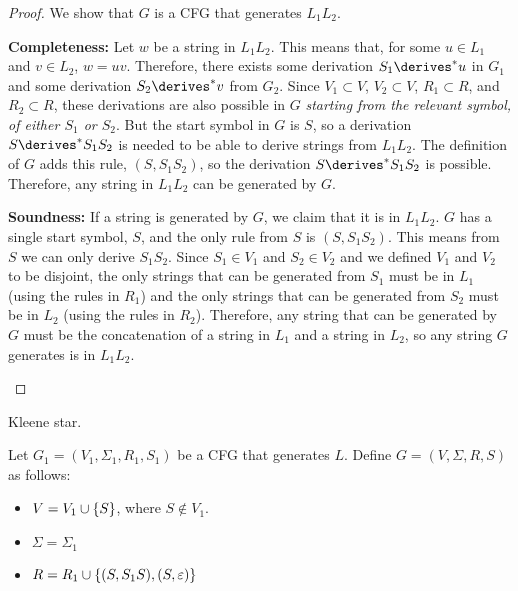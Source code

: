 \begin{problem}
\begin{enumalph}
\begin{Answer}
\begin{claim}
        \begin{proof}
          We show that $G$ is a CFG that generates $L_1L_2$.
          \begin{enumroman}
            \item \textbf{Completeness:}
              Let $w$ be a string in $L_1L_2$.
              This means that, for some $u \in L_1$ and $v \in L_2$,
              $w = uv$.
              Therefore, there exists some derivation $S_1 \derives^* u$ in $G_1$
              and some derivation $S_2 \derives^* v$ from $G_2$.
              Since  $V_1 \subset V$, $V_2 \subset V$,
              $R_1 \subset R$, and $R_2 \subset R$,
              these derivations are also possible in $G$
              \emph{starting from the relevant symbol, of either $S_1$ or $S_2$}.
              But the start symbol in $G$ is $S$, so a derivation
              $S \derives^* S_1S_2$ is needed to be able to
              derive strings from $L_1L_2$.
              The definition of $G$ adds this rule, $(S, S_1S_2)$,
              so the derivation $S \derives^* S_1S_2$ is possible.
              Therefore, any string in $L_1L_2$ can be generated by $G$.
            \item \textbf{Soundness:}
              If a string is generated by $G$, we claim that it is in $L_1L_2$.
              $G$ has a single start symbol, $S$,
              and the only rule from $S$ is $(S, S_1S_2)$.
              This means from $S$ we can only derive $S_1S_2$.
              Since $S_1 \in V_1$ and $S_2 \in V_2$ and we defined $V_1$ and $V_2$
              to be disjoint, the only strings that can be generated from $S_1$
              must be in $L_1$ (using the rules in $R_1$)
              and the only strings that can be generated from $S_2$
              must be in $L_2$ (using the rules in $R_2$).
              Therefore, any string that can be generated by $G$ must be
              the concatenation of a string in $L_1$ and a string in $L_2$,
              so any string $G$ generates is in $L_1L_2$.
          \end{enumroman}
        \end{proof}
      \end{claim}
    \end{Answer}
    \newpage
    \item Kleene star.
    \begin{Answer}
      Let $G_1 = (V_1, \Sigma_1, R_1, S_1)$ be a CFG that generates $L$.
      Define $G = (V, \Sigma, R, S)$ as follows:
      \begin{itemize}
        \item $V = V_1 \cup \left\{S\right\}$, where $S \notin V_1$.
        \item $\Sigma = \Sigma_1$
        \item $R = R_1 \cup \left\{(S, S_1S), (S, \varepsilon)\right\}$
      \end{itemize}


\end{Answer}
\end{enumalph}
\end{problem}
